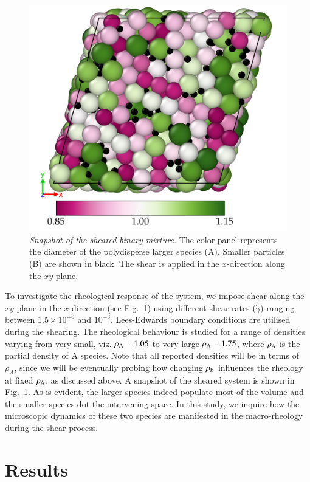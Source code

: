 %
\begin{figure}[htb!]
\centering
\includegraphics[width=12cm]{figs/fig7p1.png}
\caption{{\em Snapshot of the sheared binary mixture.} The color panel represents the diameter of the polydisperse larger species (A).  Smaller particles (B) are shown in black. The shear is applied in the $x$-direction along the $xy$ plane. 
\label{fig7p1}}
\end{figure}
%

To investigate the rheological response of the system, we impose shear along the $xy$ plane in the $x$-direction (see Fig.~\ref{fig7p1}) using different shear rates ($\dot{\gamma}$) ranging between $1.5{\times}10^{-6}$ and $10^{-3}$. Lees-Edwards boundary conditions are utilised during the shearing. The rheological behaviour is studied for a range of densities varying from very small, viz. $\rho_{\rm A}=1.05$ to very large $\rho_{\rm A}=1.75$, where $\rho_{\rm A}$ is the partial density of A species.  Note that all reported densities will be in terms of $\rho_A$, since we will be eventually probing how changing $\rho_{\rm B}$ influences the rheology at fixed $\rho_{\rm A}$, as discussed above. A snapshot of the sheared system is shown in Fig.~\ref{fig7p1}. As is evident, the larger species indeed populate most of the volume and the smaller species dot the intervening space. In this study, we inquire how the microscopic dynamics of these two species are manifested in the macro-rheology during the shear process.

%
\section{Results}

